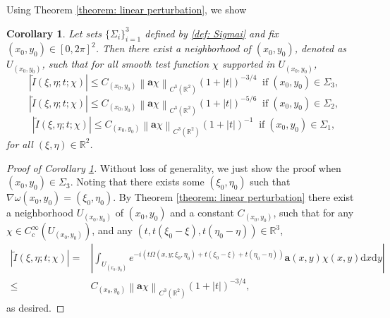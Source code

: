 \documentclass[12pt]{amsart}
\newtheorem{corollary}{Corollary}[section]
\newcommand\norm[1]{\left\|#1\right\|}
\newcommand{\R}{\mathbb{R}}
\def\d{\mathrm{d}}
\begin{document}
Using Theorem \ref{theorem: linear perturbation}, we show
\begin{corollary}\label{coro: decomposition of torus}
    Let sets $\{\Sigma_{i}\}_{i=1}^{3}$ defined by \eqref{def: Sigmai} and fix $\left(x_{0},y_{0}\right)\in\left[0,2\pi\right]^{2}$. Then there exist a neighborhood of $\left(x_{0},y_{0}\right)$, denoted as $U_{\left(x_{0},y_{0}\right)}$, such that for all smooth test function $\chi$ supported in $U_{\left(x_{0},y_{0}\right)}$,
    \begin{equation}
        \left|\widetilde{I}\left(\xi,\eta;t;\chi\right)\right|\leq C_{\left(x_{0},y_{0}\right)}\norm{\mathbf{a}\chi}_{C^{3}\left(\R^{2}\right)}\left(1+\left|t\right|\right)^{-3/4}\;\;\mathrm{if}\;\left(x_{0},y_{0}\right)\in \Sigma_{3},
    \end{equation}
    \begin{equation}
        \left|\widetilde{I}\left(\xi,\eta;t;\chi\right)\right|\leq C_{\left(x_{0},y_{0}\right)}\norm{\mathbf{a}\chi}_{C^{3}\left(\R^{2}\right)}\left(1+\left|t\right|\right)^{-5/6}\;\;\mathrm{if}\;\left(x_{0},y_{0}\right)\in \Sigma_{2},
    \end{equation}
    \begin{equation}
        \left|\widetilde{I}\left(\xi,\eta;t;\chi\right)\right|\leq C_{\left(x_{0},y_{0}\right)}\norm{\mathbf{a}\chi}_{C^{3}\left(\R^{2}\right)}\left(1+\left|t\right|\right)^{-1}\;\;\mathrm{if}\;\left(x_{0},y_{0}\right)\in \Sigma_{1},
    \end{equation}
    for all $\left(\xi,\eta\right)\in\R^{2}$.
\end{corollary}
\begin{proof}[Proof of Corollary \ref{coro: decomposition of torus}]
    Without loss of generality, we just show the proof when $\left(x_{0},y_{0}\right)\in \Sigma_{3}$. Noting that there exists some $\left(\xi_{0},\eta_{0}\right)$ such that $\nabla\omega\left(x_{0},y_{0}\right)=\left(\xi_{0},\eta_{0}\right)$. By Theorem \ref{theorem: linear perturbation} there exist a neighborhood $U_{\left(x_{0},y_{0}\right)}$ of $\left(x_{0},y_{0}\right)$ and a constant $C_{\left(x_{0},y_{0}\right)}$, such that for any $\chi\in C^{\infty}_{c}\left(U_{\left(x_{0},y_{0}\right)}\right)$, and any $\left(t,t\left(\xi_{0}-\xi\right),t\left(\eta_{0}-\eta\right)\right)\in\R^{3}$, 
    \begin{equation*}
        \begin{aligned}
            \left|\widetilde{I}\left(\xi,\eta;t;\chi\right)\right|=&\left|\int_{U_{\left(x_{0},y_{0}\right)}}e^{-i\left(t\Omega\left(x,y;\xi_{0},\eta_{0}\right)+t\left(\xi_{0}-\xi\right)+t\left(\eta_{0}-\eta\right)\right)}\mathbf{a}\left(x,y\right)\chi\left(x,y\right)\d x\d y\right|\\
            \leq& C_{\left(x_{0},y_{0}\right)}\norm{\mathbf{a}\chi}_{C^{3}\left(\R^{2}\right)}\left(1+\left|t\right|\right)^{-3/4},
        \end{aligned}
    \end{equation*}
    as desired.
\end{proof}
\end{document}
